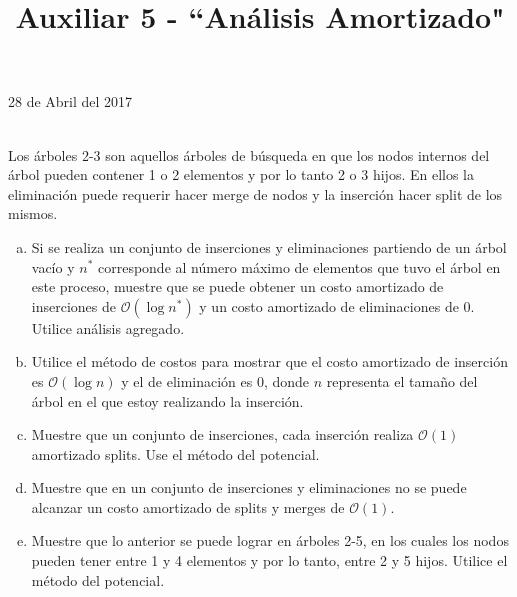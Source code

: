 \documentclass[dcc,uchile]{fcfmcourse}
\title{Auxiliar 5 - ``Análisis Amortizado"}
\begin{document}
\maketitle
\begin{center}
28 de Abril del 2017
\end{center}
\vspace{-1ex}


\begin{problems}
\\
Los árboles 2-3 son aquellos árboles de búsqueda en que los nodos internos del árbol pueden contener 1 o 2 elementos y por lo tanto 2 o 3 hijos. En ellos la eliminación puede requerir hacer merge de nodos y la inserción hacer split de los mismos.
\begin{enumerate}[a)]
    \item Si se realiza un conjunto de inserciones y eliminaciones partiendo de un árbol vacío y $n^*$ corresponde al número máximo de elementos que tuvo el árbol en este proceso, muestre que se puede obtener un costo amortizado de inserciones de $\mathcal{O}(\log n^*)$ y un costo amortizado de eliminaciones de $0$. Utilice análisis agregado.
    \item Utilice el método de costos para mostrar que el costo amortizado de inserción es $\mathcal{O}(\log n)$ y el de eliminación es $0$, donde $n$ representa el tamaño del árbol en el que estoy realizando la inserción.
    \item Muestre que un conjunto de inserciones, cada inserción realiza $\mathcal{O}(1)$ amortizado splits. Use el método del potencial.
    \item Muestre que en un conjunto de inserciones y eliminaciones no se puede alcanzar un costo amortizado de splits y merges de $\mathcal{O}(1)$.
    \item Muestre que lo anterior se puede lograr en árboles 2-5, en los cuales los nodos pueden tener entre 1 y 4 elementos y por lo tanto, entre 2 y 5 hijos. Utilice el método del potencial.
\end{enumerate}


\end{problems}
\end{document}
